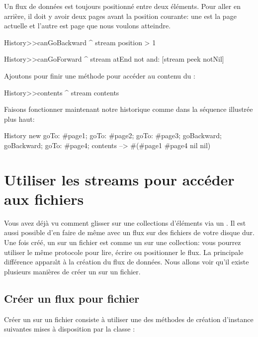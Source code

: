 \documentclass[a4paper,10pt,twoside]{book}
\begin{document}
Un flux de donn\'ees est toujours positionn\'e entre deux \'el\'ements.
Pour aller en arri\`ere, il doit y avoir deux pages avant la position courante:
une est la page actuelle et l'autre est page que nous voulons atteindre.

\begin{code}{}
History>>canGoBackward
  ^ stream position > 1

History>>canGoForward
  ^ stream atEnd not and: [stream peek notNil]
\end{code}

Ajoutons pour finir une m\'ethode pour acc\'eder au contenu du \stream:
\begin{code}{}
History>>contents
  ^ stream contents
\end{code}

Faisons fonctionner maintenant notre historique 
comme dans la s\'equence illustr\'ee plus haut:
\begin{code}{}
History new
	goTo: #page1;
	goTo: #page2;
	goTo: #page3;
	goBackward;
	goBackward;
	goTo: #page4;
	contents --> #(#page1 #page4 nil nil)
\end{code}

\section{Utiliser les streams pour acc\'eder aux fichiers}

Vous avez d\'ej\`a vu comment glisser sur une collections d'\'el\'ements via
un \stream. Il est aussi possible d'en faire de m\^eme avec un flux 
sur des fichiers de votre disque dur.
Une fois cr\'e\'e, un \stream sur un fichier est comme un \stream sur
une collection: vous pourrez utiliser le m\^eme protocole pour lire, \'ecrire
ou positionner le flux.
La principale diff\'erence appara\^{\i}t \`a la cr\'eation du flux de donn\'ees.
Nous allons voir qu'il existe plusieurs mani\`eres de cr\'eer un \stream sur un fichier.

\subsection{Cr\'eer un flux pour fichier}
\label{sec:creat-file-stre}

Cr\'eer un \stream sur un fichier consiste \`a utiliser une des m\'ethodes
de cr\'eation d'instance suivantes mises \`a disposition par la classe
:
\end{document}
